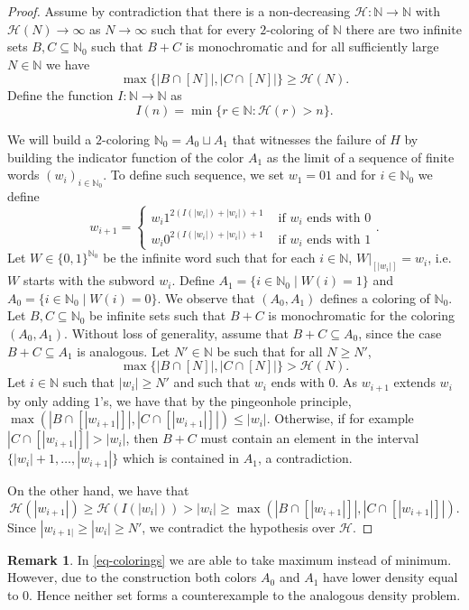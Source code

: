 \documentclass[letter, 11pt]{article}
\theoremstyle{plain} %
\theoremstyle{definition} %
\newtheorem{remark}[theorem]{Remark}
\theoremstyle{plain}
\theoremstyle{plain}
\newcommand{\N}{\mathbb{N}}
\newcommand{\1}{\mathbbm{1}}
\begin{document}
\begin{proof}
    Assume by contradiction that there is a non-decreasing $\mathcal{H}:\N\to \N$ with $\mathcal{H}(N) \to \infty$ as $N\to \infty$ such that for every $2$-coloring of $\N$ there are two infinite sets $B,C\subseteq \N_0$ such that $B+C$ is monochromatic and for all sufficiently large $N\in \N$ we have 
       $$\max\{|B\cap [N]|, |C\cap [N]|\} \geq \mathcal{H}(N) .$$
    Define the function $I:\N\to \N$ as 
    $$I(n)= \min\{ r\in \N: \mathcal{H}(r)>n\}. $$
       
       We will build a $2$-coloring $\N_0=A_0\sqcup A_1$ that witnesses the failure of $H$ by building the indicator function of the color $A_1$ as the limit of a sequence of finite words $(w_i)_{i\in \N_0}$. To define such sequence, we set $w_1=01$ and for $i\in \N_0$ we define
       $$w_{i+1}= \begin{cases}
           w_i1^{2(I(|w_i|)+|w_i|)+1} & \text{ if }w_i \text{ ends with }0 \\
           w_i0^{2(I(|w_i|)+|w_i|)+1}& \text{ if }w_i \text{ ends with }1
       \end{cases}.  $$ 
     Let $W \in \{0,1\}^{\N_0}$ be the infinite word such that for each $i\in \N$, $W|_{[|w_i|]}=w_i$, i.e. $W$ starts with the subword $w_i$. Define $A_1=\{ i\in \N_0 \mid W(i)=1\} $ and $A_0=\{ i\in \N_0 \mid W(i)=0\}$. We observe that $(A_0,A_1)$ defines a coloring of $\N_0$. Let $B,C\subseteq \N_0$ be infinite sets such that $B+C$ is monochromatic for the coloring $(A_0,A_1)$. Without loss of generality, assume that $B+C\subseteq A_0$, since the case $B+C\subseteq A_1$ is analogous. Let $N'\in \N$ be such that for all $N\geq N'$,  
      $$\max\{|B\cap [N]|, |C\cap[N]|\}> \mathcal{H}(N). $$
      Let $i\in \N$ such that $|w_i|\geq N'$ and such that $w_i$ ends with $0$. As $w_{i+1}$ extends $w_i$ by only adding $1$'s, we have that by the pingeonhole principle, $\max(|B\cap [|w_{i+1}|]|,|C\cap [|w_{i+1}|]|)\leq |w_i|$. Otherwise, if for example $|C\cap [|w_{i+1}|]|>|w_i|$, then $B+C$ must contain an element in the interval $\{|w_i|+1,\ldots,|w_{i+1}|\}$ which is contained in $A_1$, a contradiction.
      
      On the other hand, we have that $$\mathcal{H}(|w_{i+1}|)\geq \mathcal{H}(I(|w_i|))>|w_i|\geq \max(|B\cap [|w_{i+1}|]|,|C\cap [|w_{i+1}|]|). $$
      Since $|w_{i+1|}\geq |w_i|\geq N'$, we contradict the hypothesis over $\mathcal{H}$. 
\end{proof}
\begin{remark}\label{remark-max-min}
    In \cref{eq-colorings} we are able to take maximum instead of minimum. However, due to the construction both colors $A_0$ and $A_1$ have lower density equal to $0$. Hence neither set forms a counterexample to the analogous density problem.
\end{remark}
\end{document}
